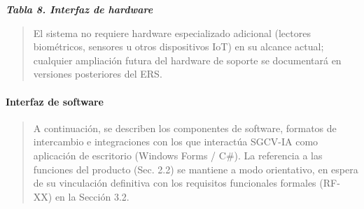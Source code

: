 \documentclass[
]{article}
\begin{document}
\protect{}\label{table8}{}\emph{\textbf{Tabla 8.
Interfaz de hardware}}

\begin{quote}
El sistema no requiere hardware especializado adicional (lectores
biométricos, sensores u otros dispositivos IoT) en su alcance actual;
cualquier ampliación futura del hardware de soporte se documentará en
versiones posteriores del ERS.
\end{quote}

\paragraph{Interfaz de software}\label{interfaz-de-software}

\begin{quote}
A continuación, se describen los componentes de software, formatos de
intercambio e integraciones con los que interactúa SGCV-IA como
aplicación de escritorio (Windows Forms / C\#). La referencia a las
funciones del producto (Sec. 2.2) se mantiene a modo orientativo, en
espera de su vinculación definitiva con los requisitos funcionales
formales (RF-XX) en la Sección 3.2.
\end{quote}
\end{document}
